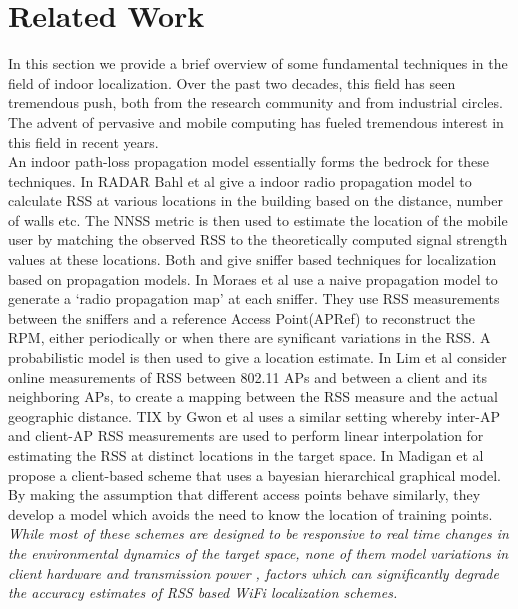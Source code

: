 \section{Related Work}
\label{sec:relatedwork}

In this section we provide a brief overview of some fundamental techniques in the field of indoor localization. Over the past two decades, this field has seen tremendous push, both from the research community and from industrial circles. The advent of pervasive and mobile computing has fueled tremendous interest in this field in recent years.  \\

 An indoor path-loss propagation model essentially forms the bedrock for these techniques. In RADAR \cite{Bahl00radar:an} Bahl et al give a indoor radio propagation model to calculate RSS at various locations in the building based on the distance, number of walls etc. The NNSS metric is then used to estimate the location of the  mobile user by matching the observed RSS to the theoretically computed signal strength values at these locations. Both \cite{Moraes:2006:CWL:1164783.1164799} and \cite{Lim:2010:ZIL:1741400.1741464} give sniffer based techniques for localization based on propagation models. In \cite{Moraes:2006:CWL:1164783.1164799} Moraes et al  use a naive propagation model to generate a `radio propagation map' at each sniffer. They use RSS measurements between the sniffers and a reference Access Point(APRef) to reconstruct the RPM, either periodically or when there are synificant variations in the RSS. A probabilistic model is then used to give a location estimate. In \cite{Lim:2010:ZIL:1741400.1741464} Lim et al consider online measurements of RSS between 802.11 APs and between a client and its neighboring APs, to create a mapping between the RSS measure and the actual geographic distance. TIX \cite{Gwon:2004:ECC:1023783.1023786} by Gwon et al uses a similar setting whereby inter-AP and client-AP RSS measurements are used to perform linear interpolation for estimating the RSS at distinct locations in the target space. In \cite{Madigan05bayesianindoor} Madigan et al propose a client-based scheme that uses a bayesian hierarchical graphical model. By making the assumption that different access points behave similarly, they develop a model which avoids the need to know the location of training points. {\it While most of these schemes are designed to be responsive to real time changes in the environmental dynamics of the target space, none of them model variations in client hardware and transmission power , factors which can significantly degrade the accuracy estimates of RSS based WiFi localization schemes.} \\

